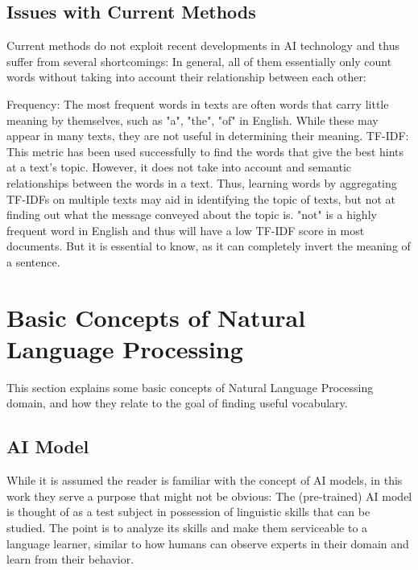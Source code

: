 \subsection{Issues with Current Methods}
Current methods do not exploit recent developments in AI technology and thus suffer from several shortcomings:
In general, all of them essentially only count words without taking into account their relationship between each other:

Frequency: The most frequent words in texts are often words that carry little meaning by themselves, such as "a", "the", "of" in English.
While these may appear in many texts, they are not useful in determining their meaning.
TF-IDF: This metric has been used successfully to find the words that give the best hints at a text's topic.
However, it does not take into account and semantic relationships between the words in a text.
Thus, learning words by aggregating TF-IDFs on multiple texts may aid in identifying the topic of texts, but not at finding out what the message conveyed about the topic is.
"not" is a highly frequent word in English and thus will have a low TF-IDF score in most documents. But it is essential to know, as it can completely invert the meaning of a sentence.

\section{Basic Concepts of Natural Language Processing} \label{seq:basic-nlp-concepts}
This section explains some basic concepts of Natural Language Processing domain, and how they relate to the goal of finding useful vocabulary.


	\subsection {AI Model}
	      While it is assumed the reader is familiar with the concept of AI models, in this work they serve a purpose that might not be obvious:
	      The (pre-trained) AI model is thought of as a test subject in possession of linguistic skills that can be studied.
	      The point is to analyze its skills and make them serviceable to a language learner, similar to how humans can observe experts in their domain and learn from their behavior.

